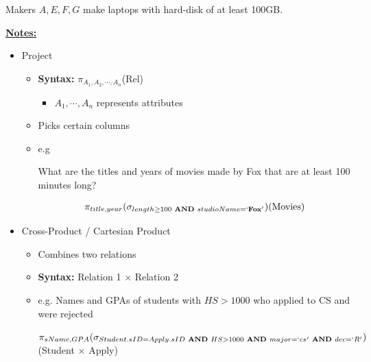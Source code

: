 \documentclass[12pt]{article}
\begin{document}
\begin{enumerate}
\begin{enumerate}[a)]
\begin{mdframed}
            \bigskip

            Makers $A,E,F,G$ make laptops with hard-disk of at least 100GB.
        \end{mdframed}

        \bigskip

        \underline{\textbf{Notes:}}

        \bigskip

        \begin{itemize}
            \item Project
            \begin{itemize}
                \item \textbf{Syntax:} $\pi_{A_1, A_2, \cdots, A_n}$(Rel)
                \begin{itemize}
                    \item $A_1,\cdots,A_n$ represents attributes
                \end{itemize}
                \item Picks certain columns
                \item e.g

                \bigskip

                What are the titles and years of movies made by Fox that
                are at least 100 minutes long?

                \begin{align*}
                    \pi_{title,year}(\sigma_{length \geq 100 \textbf{ AND } studioName=`\textbf{Fox}'})(\text{Movies})
                \end{align*}
            \end{itemize}

            \item Cross-Product / Cartesian Product
            \begin{itemize}
                \item Combines two relations
                \item \textbf{Syntax:} Relation 1 $\times$ Relation 2
                \item e.g. Names and GPAs of students with $HS > 1000$ who applied
                to CS and were rejected

                \bigskip

                $ \pi_{sName, GPA}(\sigma_{Student.sID = Apply.sID \textbf{ AND }
                HS > 1000 \textbf{ AND } major = `cs' \textbf{ AND } dec = `R'})$(Student $\times$ Apply)


\end{itemize}
\end{itemize}
\end{enumerate}
\end{enumerate}
\end{document}
